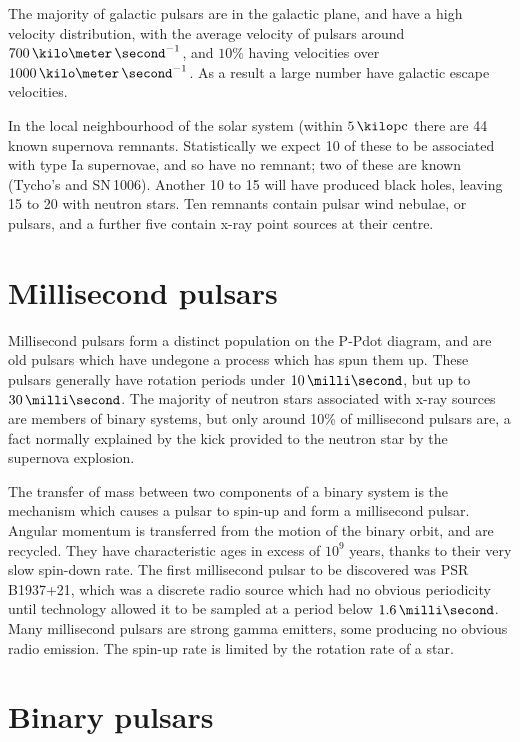 The majority of galactic pulsars are in the galactic plane, and have a
high velocity distribution, with the average velocity of pulsars
around $700\,\kilo\meter\,\second^{-1}$, and $10\%$ having velocities
over $1000\,\kilo\meter\,\second^{-1}$. As a result a large number
have galactic escape velocities.

In the local neighbourhood of the solar system (within
$5\,\kilo\text{pc}$ there are 44 known supernova
remnants. Statistically we expect 10 of these to be associated with
type Ia supernovae, and so have no remnant; two of these are known
(Tycho's and SN\,1006). Another 10 to 15 will have produced black
holes, leaving 15 to 20 with neutron stars. Ten remnants contain
pulsar wind nebulae, or pulsars, and a further five contain x-ray
point sources at their centre.


\section{Millisecond pulsars}
\label{sec:millisecond-pulsars}

Millisecond pulsars form a distinct population on the P-Pdot diagram,
and are old pulsars which have undegone a process which has spun them
up. These pulsars generally have rotation periods under
$10\,\milli\second$, but up to $30\,\milli\second$. The majority of
neutron stars associated with x-ray sources are members of binary
systems, but only around 10\% of millisecond pulsars are, a fact
normally explained by the kick provided to the neutron star by the
supernova explosion. 

The transfer of mass between two components of a binary system is the
mechanism which causes a pulsar to spin-up and form a millisecond
pulsar. Angular momentum is transferred from the motion of the binary
orbit, and are recycled. They have characteristic ages in excess of
$10^9$ years, thanks to their very slow spin-down rate. The first
millisecond pulsar to be discovered was PSR\,B1937+21, which was a
discrete radio source which had no obvious periodicity until
technology allowed it to be sampled at a period below
$1.6\,\milli\second$. Many millisecond pulsars are strong gamma
emitters, some producing no obvious radio emission. The spin-up rate
is limited by the rotation rate of a star.

\section{Binary pulsars}
\label{sec:binary-pulsars}


